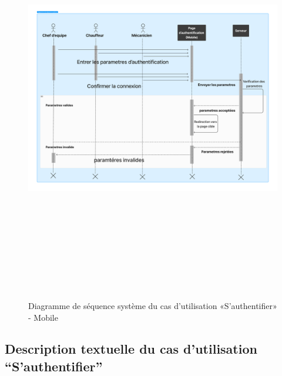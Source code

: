 \begin{figure}[ht!]
  \centering
  \includegraphics[width=1\textwidth,height=18cm]{chap3.images/2.png}
  \caption{Diagramme de séquence système du cas d’utilisation «S’authentifier» - Mobile}

\end{figure}
\newpage
\subsection{Description textuelle du cas d’utilisation “S’authentifier”}

